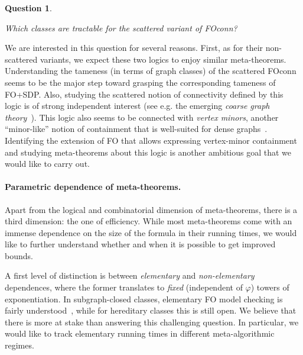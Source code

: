 \documentclass[a4paper,11pt]{article}
\newcommand{\fo}{\textsf{FO}\xspace}
\newcommand{\fosdp}{\textsf{FO+SDP}\xspace}
\newcommand{\foconn}{\textsf{FO\text{+}conn}\xspace}
\newcommand{\mso}{\textsf{MSO}\xspace}
\newcommand{\cmsot}{\textsf{CMSO$_2$}\xspace}
\newtheorem{quest}{Question}
\newenvironment{question}
  {\begin{quest}\begin{mdframed}[style=questionstyle]}
  {\end{mdframed}\end{quest}}
\begin{document}
\begin{question}\label{q:sfoconn}
    Which classes are tractable for the scattered variant of \foconn?
\end{question}
We are interested in this question for several reasons.
First, as for their non-scattered variants, we expect these two logics to enjoy similar meta-theorems.
Understanding the tameness (in terms of graph classes) of the scattered \foconn seems to be the major step toward grasping the corresponding tameness of \fosdp.
Also, studying the scattered notion of connectivity defined by this logic is of strong independent interest (see e.g. the emerging  \emph{coarse graph theory}~\cite{GeorgakopoulosP25}).
This logic also seems to be connected with \emph{vertex minors}, another ``minor-like'' notion of containment that is well-suited for dense graphs~\cite{BuffiereKOdM24}.
Identifying the extension of \fo that allows expressing vertex-minor containment and studying meta-theorems about this logic is another ambitious goal that we would like to carry out.

\paragraph{Parametric dependence of meta-theorems.}
Apart from the logical and combinatorial dimension of meta-theorems, there is a third dimension: the one of efficiency. While most meta-theorems come with an immense dependence on the size of the formula in their running times, we would like to further understand whether and when it is possible to get improved bounds.

A first level of distinction is between \emph{elementary} and \emph{non-elementary} dependences, where the former translates to \textit{fixed} (independent of $\varphi$) towers of exponentiation.
In subgraph-closed classes, elementary \fo model checking is fairly understood~\cite{GajarskyPSST24elem}, while for hereditary classes this is still open.
We believe that there is more at stake than answering this challenging question.
In particular, we would like to track elementary running times in different meta-algorithmic regimes.
\end{document}
